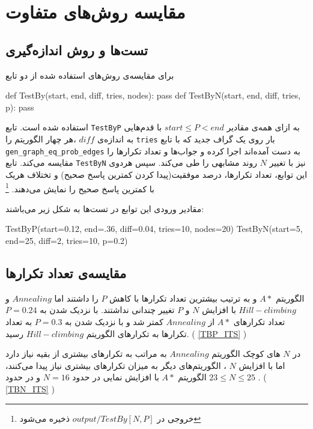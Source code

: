 \chapter{مقایسه روش‌های متفاوت}
\section{تست‌ها و روش اندازه‌گیری}
برای مقایسه‌ی روش‌های استفاده شده از دو تابع 

\begin{latin}
\begin{python}
def TestBy(start, end, diff, tries, nodes):
	pass
def TestByN(start, end, diff, tries, p):
	pass
\end{python}
\end{latin}

استفاده شده است. تابع
\verb;TestByP;
به ازای همه‌ی مقادیر
$start\leq P < end$
با قدم‌هایی به اندازه‌ی 
$diff$
،هر چهار الگوریتم را 
\verb;tries;
بار روی  یک گراف جدید که با تابع 
\verb;gen_graph_eq_prob_edges;
به دست آمده‌اند اجرا کرده و  جواب‌ها و تعداد تکرار‌ها را مقایسه می‌کند.
تابع 
\verb;TestByN;
نیز با تغییر 
$N$
روند مشابهی را طی می‌کند.
سپس هردوی این توابع، تعداد تکرارها، درصد موفقیت(پیدا کردن کمترین پاسخ صحیح) و تختلاف هریک با کمترین پاسخ صحیح را نمایش می‌دهند.
\footnote{خروجی در $output/TestBy[N,P]$ ذخیره می‌شود}

مقادیر ورودی این توابع در تست‌ها به شکل زیر می‌باشند:
\begin{latin}
\begin{python}
TestByP(start=0.12, end=.36, diff=0.04, tries=10, nodes=20)
TestByN(start=5, end=25, diff=2, tries=10, p=0.2)
\end{python}
\end{latin}


\section{مقایسه‌ی تعداد تکرارها}
الگوریتم 
$A*$
و
به ترتیب بیشترین تعداد تکرار‌ها با کاهش 
$P$
را داشتند اما
$Annealing$
و
$Hill-climbing$
با افزایش 
$N$
و
$P$
تغییر چندانی نداشتند.
با نزدیک شدن به 
$P=0.24$
تعداد تکرارهای
$A*$
از
$Annealing$
کمتر شد و با نزدیک شدن به
$P=0.3$
به تعداد تکرار‌ها به تکرارهای الگوریتم
$Hill-climbing$
رسید.
(
\cref{TBP_ITS}
)

در
$N$
های کوچک الگوریتم
$Annealing$
به مراتب به تکرارهای بیشتری از بقیه نیاز دارد اما با افزایش
$N$
،
 الگوریتم‌های دیگر به میزان تکرار‌های بیشتری نیاز پیدا می‌کنند،
 الگوریتم
$A*$
با افزایش نمایی
 در حدود
$N=16$
و 
در حدود
$23\leq N \leq 25$
.
(
\cref{TBN_ITS}
)

